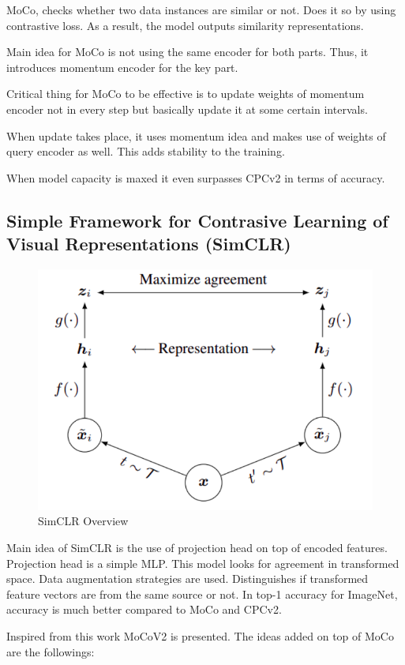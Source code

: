 \documentclass{article}
\begin{document}
MoCo, checks whether two data instances are similar or not.
Does it so by using contrastive loss.
As a result, the model outputs similarity representations.
 
Main idea for MoCo is not using the same encoder for both parts.
Thus, it introduces momentum encoder for the key part.
 
Critical thing for MoCo to be effective is to update
weights of momentum encoder not in every step but basically
update it at some certain intervals.
 
When update takes place, it uses momentum idea and makes use of weights
of query encoder as well. This adds stability to the training.
 
When model capacity is maxed it even surpasses CPCv2 in terms of accuracy.
 
\subsection{Simple Framework for Contrasive
Learning of  Visual Representations (SimCLR) \cite{chen2020simple}}
 
\begin{figure}[H]
   \centering
   \includegraphics[width=0.8\linewidth]{figures/simclr.png}
   \caption{SimCLR Overview}
   \label{fig:simclr}
\end{figure}
 
Main idea of SimCLR is the use of projection head on top of
encoded features. Projection head is a simple MLP.
This model looks for agreement in transformed space.
Data augmentation strategies are used.
Distinguishes if transformed feature vectors are from the same
source or not.
In top-1 accuracy for ImageNet, accuracy is much better compared to
MoCo and CPCv2.
 
Inspired from this work MoCoV2 is presented.
The ideas added on top of MoCo are the followings:
 
\end{document}
